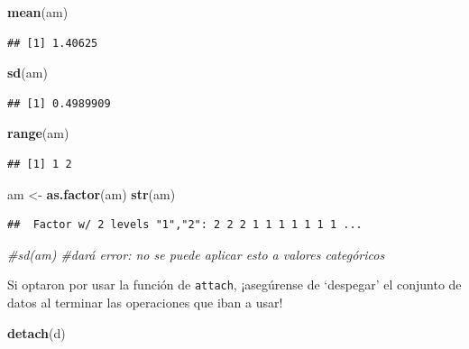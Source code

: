 \documentclass[
]{article}
\newenvironment{Shaded}{\begin{snugshade}}{\end{snugshade}}
\newcommand{\CommentTok}[1]{\textcolor[rgb]{0.56,0.35,0.01}{\textit{#1}}}
\newcommand{\FunctionTok}[1]{\textcolor[rgb]{0.13,0.29,0.53}{\textbf{#1}}}
\newcommand{\NormalTok}[1]{#1}
\newcommand{\OtherTok}[1]{\textcolor[rgb]{0.56,0.35,0.01}{#1}}
\begin{document}
\begin{Shaded}
\begin{Highlighting}[]
\FunctionTok{mean}\NormalTok{(am)}
\end{Highlighting}
\end{Shaded}

\begin{verbatim}
## [1] 1.40625
\end{verbatim}

\begin{Shaded}
\begin{Highlighting}[]
\FunctionTok{sd}\NormalTok{(am)}
\end{Highlighting}
\end{Shaded}

\begin{verbatim}
## [1] 0.4989909
\end{verbatim}

\begin{Shaded}
\begin{Highlighting}[]
\FunctionTok{range}\NormalTok{(am)}
\end{Highlighting}
\end{Shaded}

\begin{verbatim}
## [1] 1 2
\end{verbatim}

\begin{Shaded}
\begin{Highlighting}[]
\NormalTok{am }\OtherTok{\textless{}{-}} \FunctionTok{as.factor}\NormalTok{(am)}
\FunctionTok{str}\NormalTok{(am)}
\end{Highlighting}
\end{Shaded}

\begin{verbatim}
##  Factor w/ 2 levels "1","2": 2 2 2 1 1 1 1 1 1 1 ...
\end{verbatim}

\begin{Shaded}
\begin{Highlighting}[]
\CommentTok{\#sd(am) \#dará error: no se puede aplicar esto a valores categóricos}
\end{Highlighting}
\end{Shaded}

Si optaron por usar la función de \texttt{attach}, ¡asegúrense de
`despegar' el conjunto de datos al terminar las operaciones que iban a
usar!

\begin{Shaded}
\begin{Highlighting}[]
\FunctionTok{detach}\NormalTok{(d)}
\end{Highlighting}
\end{Shaded}
\end{document}
